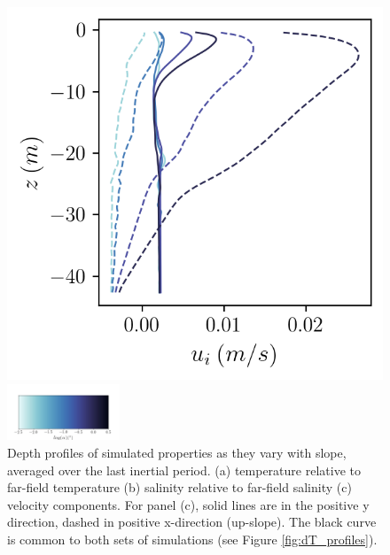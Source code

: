 \documentclass[draft]{agujournal2019}
\begin{document}
\begin{figure}[h!]
\begin{minipage}{0.33\textwidth}
    \end{minipage}%
    \begin{minipage}{0.33\textwidth}
        \includegraphics[trim={0 7.5cm 0 0},clip, width=\textwidth]{Figures/velocity_cmp_dslope_43h_tav13h_z_profile.png}
    \end{minipage}
    \newline
    \includegraphics[width=0.3\textwidth,trim={1cm 0cm 1cm 5cm}, clip]{Figures/colorbar_slope.png}
    \caption{Depth profiles of simulated properties as they vary with slope, averaged over the last inertial period. (a) temperature relative to far-field temperature (b) salinity relative to far-field salinity (c) velocity components. For panel (c), solid lines are in the positive y direction, dashed in positive x-direction (up-slope). The black curve is common to both sets of simulations (see Figure \ref{fig:dT_profiles}).}
    \label{fig:dslope_profiles}
\end{figure}
\end{document}
